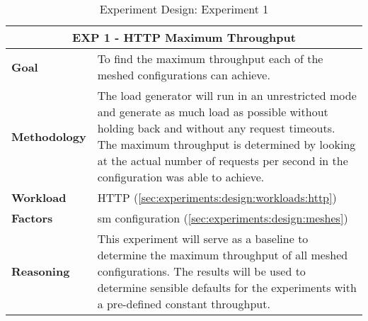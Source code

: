 \begin{table}[!t]
    \centering

    \begin{tabularx}{\textwidth}{l X}
    
        \toprule
        \multicolumn{2}{c}{\textbf{EXP 1 - HTTP Maximum Throughput}}  \\
        \toprule
        
        \textbf{Goal}
        & To find the maximum throughput each of the meshed configurations can achieve. \\
        \midrule
        
        \textbf{Methodology}
        & The load generator will run in an unrestricted mode and generate as much load as possible without holding back and without any request timeouts. The maximum throughput is determined by looking at the actual number of requests per second in the configuration was able to achieve. \\
        \midrule
        
        \textbf{Workload} 
        & HTTP (\cref{sec:experiments:design:workloads:http}) \\
        \midrule

        \multirow{1}{*}{\textbf{Factors}} 
        & \Gls{sm} configuration (\cref{sec:experiments:design:meshes}) \\
        \midrule
        
        \textbf{Reasoning}
        & This experiment will serve as a baseline to determine the maximum throughput of all meshed configurations. The results will be used to determine sensible defaults for the experiments with a pre-defined constant throughput. \\

        \bottomrule

    \end{tabularx}
    \caption[Experiment Design: Experiment 1]{Experiment Design: Experiment 1}
    \label{tab:experiment:design:01}
\end{table}